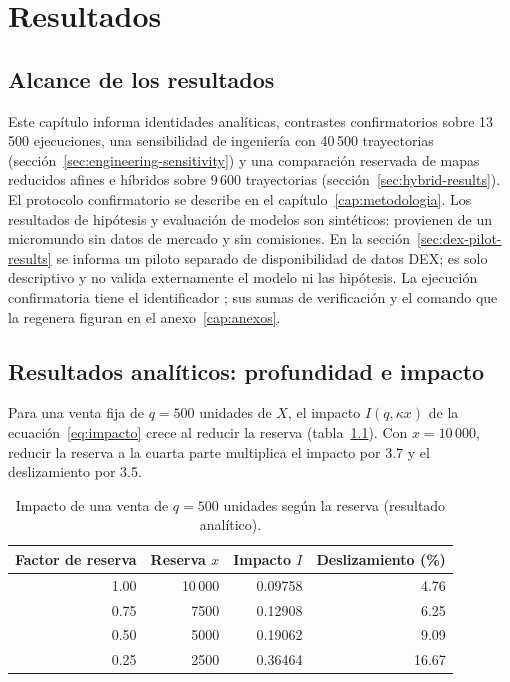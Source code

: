\chapter{Resultados}
\label{cap:resultados}

\section{Alcance de los resultados}

Este capítulo informa identidades analíticas, contrastes confirmatorios sobre 13\,500 ejecuciones, una sensibilidad de ingeniería con 40\,500 trayectorias (sección~\ref{sec:engineering-sensitivity}) y una comparación reservada de mapas reducidos afines e híbridos sobre 9\,600 trayectorias (sección~\ref{sec:hybrid-results}). El protocolo confirmatorio se describe en el capítulo~\ref{cap:metodologia}. Los resultados de hipótesis y evaluación de modelos son sintéticos: provienen de un micromundo sin datos de mercado y sin comisiones. En la sección~\ref{sec:dex-pilot-results} se informa un piloto separado de disponibilidad de datos DEX; es solo descriptivo y no valida externamente el modelo ni las hipótesis. La ejecución confirmatoria tiene el identificador \code{\RunID}; sus sumas de verificación y el comando que la regenera figuran en el anexo~\ref{cap:anexos}.

\section{Resultados analíticos: profundidad e impacto}
\label{sec:res-analitico}

Para una venta fija de $q=500$ unidades de $X$, el impacto $I(q,\kappa x)$ de la ecuación~\eqref{eq:impacto} crece al reducir la reserva (tabla~\ref{tab:impacto}). Con $x=10\,000$, reducir la reserva a la cuarta parte multiplica el impacto por 3.7 y el deslizamiento por 3.5.

\begin{table}[htbp]
\centering
\caption{Impacto de una venta de $q=500$ unidades según la reserva (resultado analítico).}
\label{tab:impacto}
\small
\begin{tabular}{@{}rrrr@{}}
\toprule
Factor de reserva & Reserva $x$ & Impacto $I$ & Deslizamiento (\%) \\
\midrule
1.00 & 10\,000 & 0.09758 & 4.76 \\
0.75 & 7500 & 0.12908 & 6.25 \\
0.50 & 5000 & 0.19062 & 9.09 \\
0.25 & 2500 & 0.36464 & 16.67 \\
\bottomrule
\end{tabular}
\end{table}

